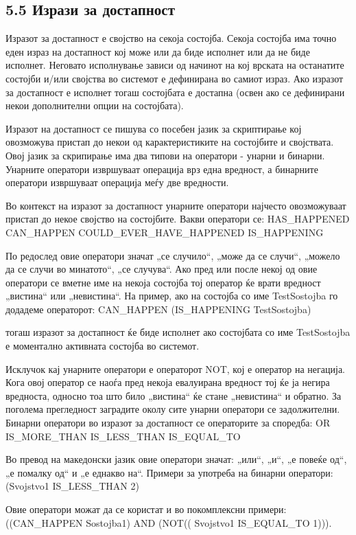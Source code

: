 \subsection{5.5 Изрази за достапност}

Изразот за достапност е својство на секоја состојба. Секоја состојба има точно еден израз на достапност кој може или да биде исполнет или да не биде исполнет. Неговато исполнување зависи од начинот на кој врската на останатите состојби и/или својства во системот е дефинирана во самиот израз. Ако изразот за достапност е исполнет тогаш состојбата е достапна (освен ако се дефинирани некои дополнителни опции на состојбата).

Изразот на достапност се пишува со посебен јазик за скриптирање кој овозможува пристап до некои од карактеристиките на состојбите и својствата. Овој јазик за скрипирање има два типови на оператори - унарни и бинарни. Унарните оператори извршуваат операција врз една вредност, а бинарните оператори извршуваат операција меѓу две вредности.

Во контекст на изразот за достапност унарните оператори најчесто овозможуваат пристап до некое својство на состојбите. Вакви оператори се: HAS\_HAPPENED CAN\_HAPPEN COULD\_EVER\_HAVE\_HAPPENED IS\_HAPPENING

По редослед овие оператори значат „се случило“, „може да се случи“, „можело да се случи во минатото“, „се случува“. Ако пред или после некој од овие оператори се вметне име на некоја состојба тој оператор ќе врати вредност „вистина“ или „невистина“. На пример, ако на состојба со име TestSostojba го додадеме операторот: CAN\_HAPPEN (IS\_HAPPENING TestSostojba)

тогаш изразот за достапност ќе биде исполнет ако состојбата со име TestSostojba е моментално активната состојба во системот.

Исклучок кај унарните оператори е операторот NOT, кој е оператор на негација. Кога овој оператор се наоѓа пред некоја евалуирана вредност тој ќе ја негира вредноста, односно тоа што било „вистина“ ќе стане „невистина“ и обратно. За поголема прегледност заградите околу сите унарни оператори се задолжителни. Бинарни оператори во изразот за достапност се операторите за споредба: OR IS\_MORE\_THAN IS\_LESS\_THAN IS\_EQUAL\_TO

Во превод на македонски јазик овие оператори значат: „или“, „и“, „е повеќе од“, „е помалку од“ и „е еднакво на“. Примери за употреба на бинарни оператори: (Svojstvo1 IS\_LESS\_THAN 2)

Овие оператори можат да се користат и во покомплексни примери: ((CAN\_HAPPEN Sostojba1) AND (NOT(( Svojstvo1 IS\_EQUAL\_TO 1))).

